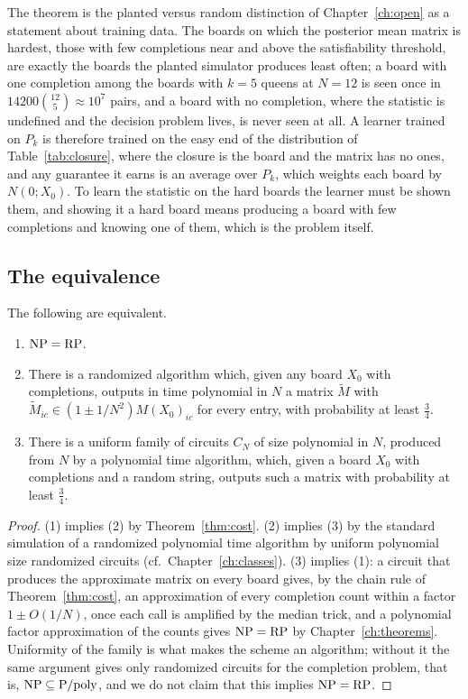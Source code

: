 The theorem is the planted versus random distinction of Chapter~\ref{ch:open} as a statement about training data. The boards on which the posterior mean matrix is hardest, those with few completions near and above the satisfiability threshold, are exactly the boards the planted simulator produces least often; a board with one completion among the boards with $k = 5$ queens at $N = 12$ is seen once in $14200 \binom{12}{5} \approx 10^7$ pairs, and a board with no completion, where the statistic is undefined and the decision problem lives, is never seen at all. A learner trained on $P_k$ is therefore trained on the easy end of the distribution of Table~\ref{tab:closure}, where the closure is the board and the matrix has no ones, and any guarantee it earns is an average over $P_k$, which weights each board by $N(0; X_0)$. To learn the statistic on the hard boards the learner must be shown them, and showing it a hard board means producing a board with few completions and knowing one of them, which is the problem itself.

\subsection*{The equivalence}

\begin{theorem}
\label{thm:jwequiv}
The following are equivalent.
\begin{enumerate}
\item $\mathrm{NP} = \mathrm{RP}$.
\item There is a randomized algorithm which, given any board $X_0$ with completions, outputs in time polynomial in $N$ a matrix $\tilde M$ with $\tilde M_{ic} \in (1 \pm 1/N^2) M(X_0)_{ic}$ for every entry, with probability at least $\tfrac34$.
\item There is a uniform family of circuits $C_N$ of size polynomial in $N$, produced from $N$ by a polynomial time algorithm, which, given a board $X_0$ with completions and a random string, outputs such a matrix with probability at least $\tfrac34$.
\end{enumerate}
\end{theorem}

\begin{proof}
(1) implies (2) by Theorem~\ref{thm:cost}. (2) implies (3) by the standard simulation of a randomized polynomial time algorithm by uniform polynomial size randomized circuits (cf.\ Chapter~\ref{ch:classes}). (3) implies (1): a circuit that produces the approximate matrix on every board gives, by the chain rule of Theorem~\ref{thm:cost}, an approximation of every completion count within a factor $1 \pm O(1/N)$, once each call is amplified by the median trick, and a polynomial factor approximation of the counts gives $\mathrm{NP} = \mathrm{RP}$ by Chapter~\ref{ch:theorems}. Uniformity of the family is what makes the scheme an algorithm; without it the same argument gives only randomized circuits for the completion problem, that is, $\mathrm{NP} \subseteq \mathrm{P/poly}$, and we do not claim that this implies $\mathrm{NP} = \mathrm{RP}$.
\end{proof}

